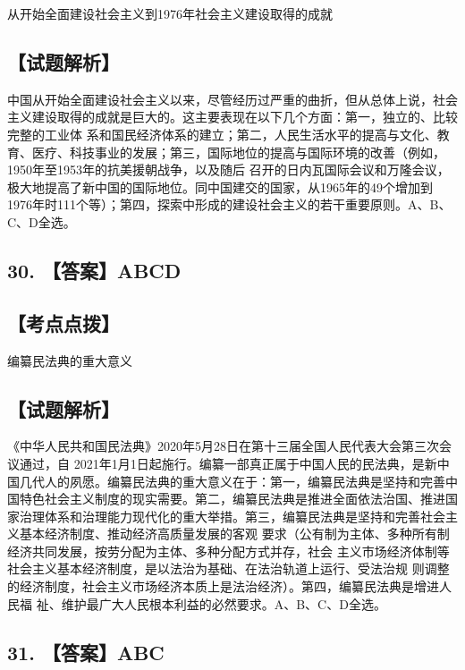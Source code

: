 \documentclass[UTF8,11pt]{ctexart}
\begin{document}
从开始全面建设社会主义到1976年社会主义建设取得的成就


\subsection*{【试题解析】}

中国从开始全面建设社会主义以来，尽管经历过严重的曲折，但从总体上说，社会 主义建设取得的成就是巨大的。这主要表现在以下几个方面：第一，独立的、比较完整的工业体 系和国民经济体系的建立；第二，人民生活水平的提高与文化、教育、医疗、科技事业的发展；第三，国际地位的提高与国际环境的改善（例如，1950年至1953年的抗美援朝战争，以及随后 召开的日内瓦国际会议和万隆会议，极大地提高了新中国的国际地位。同中国建交的国家，从1965年的49个增加到 1976年时111个等）；第四，探索中形成的建设社会主义的若干重要原则。A、B、C、D全选。


\subsection*{30. 【答案】ABCD}

\subsection*{【考点点拨】}

编纂民法典的重大意义


\subsection*{【试题解析】}

《中华人民共和国民法典》2020年5月28日在第十三届全国人民代表大会第三次会 议通过，自 2021年1月1日起施行。编纂一部真正属于中国人民的民法典，是新中国几代人的夙愿。编纂民法典的重大意义在于：第一，编纂民法典是坚持和完善中国特色社会主义制度的现实需要。第二，编纂民法典是推进全面依法治国、推进国家治理体系和治理能力现代化的重大举措。第三，编纂民法典是坚持和完善社会主义基本经济制度、推动经济高质量发展的客观 要求（公有制为主体、多种所有制经济共同发展，按劳分配为主体、多种分配方式并存，社会 主义市场经济体制等社会主义基本经济制度，是以法治为基础、在法治轨道上运行、受法治规 则调整的经济制度，社会主义市场经济本质上是法治经济）。第四，编纂民法典是增进人民福 祉、维护最广大人民根本利益的必然要求。A、B、C、D全选。


\subsection*{31. 【答案】ABC}
\end{document}
